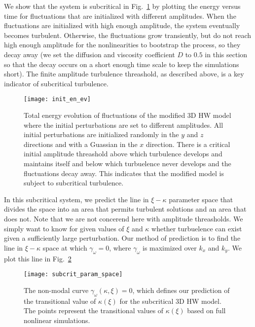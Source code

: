 \documentclass[letter,scriptaddress,twocolumn, prl,showkeys]{revtex4}
\begin{document}
We show that the system is subcritical in Fig.~\ref{init_en_ev} by plotting the energy versus time for fluctuations that are initialized with different amplitudes. When the fluctuations are initialized
with high enough amplitude, the system eventually becomes turbulent. Otherwise, the fluctuations grow transiently, but do not reach high enough amplitude for the nonlinearities to bootstrap the process,
so they decay away (we set the diffusion and viscosity coefficient $D$ to $0.5$ in this section so that the decay occurs on a short enough time scale to keep the simulations short). 
The finite amplitude turbulence threashold, as described above, is a key indicator of subcritical turbulence.

\begin{figure}
\centerline{\texttt{[image: init\_en\_ev]}}
\caption{Total energy evolution of fluctuations of the modified 3D HW model where the initial perturbations are set to different amplitudes. All initial perturbations are initialized randomly in
the $y$ and $z$ directions and with a Guassian in the $x$ direction. There is a critical initial amplitude threashold above which turbulence develops and maintains itself
and below which turbuelence never develops and the fluctuations decay away. This indicates that the modified model is subject to subcritical turbulence.}
\label{init_en_ev}
\end{figure}

In this subcritical system, we predict the line in $\xi-\kappa$ parameter space that divides the space into an area that permits turbulent solutions and an area that does not. Note that we are
not concerend here with amplitude threasholds. We simply want to know for given values of $\xi$ and $\kappa$ whether turbuelence can exist given a sufficiently large perturbation. Our method
of prediction is to find the line in $\xi-\kappa$ space at which $\gamma_\omega = 0$, where $\gamma_\omega$ is maximized over $k_x$ and $k_y$. We plot this line in Fig.~\ref{subcrit_param_space}

\begin{figure}
\centerline{\texttt{[image: subcrit\_param\_space]}}
\caption{The non-modal curve $\gamma_\omega(\kappa,\xi) = 0$, which defines our prediction of the transitional value of $\kappa(\xi)$ for the subcritical 3D HW model. The points represent the
transitional values of $\kappa(\xi)$ based on full nonlinear simulations.}
\label{subcrit_param_space}
\end{figure}
\end{document}
